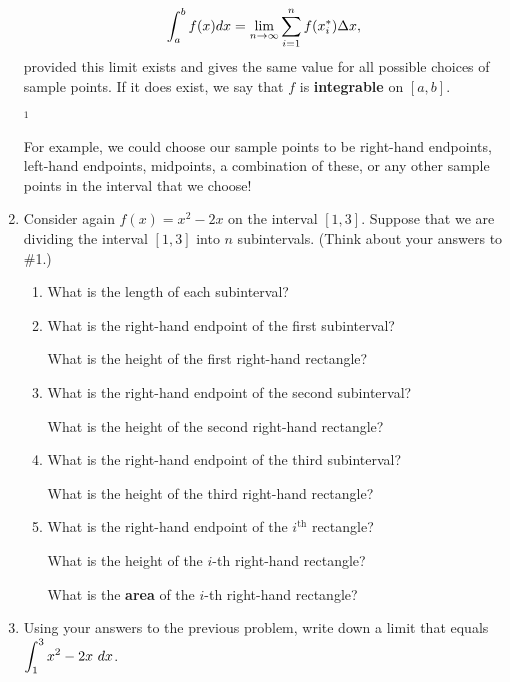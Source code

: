 \documentclass[11pt,fleqn]{article}
\newcommand{\be}{\begin{enumerate}}
\newcommand{\ee}{\end{enumerate}}
\begin{document}
\begin{enumerate}
\begin{framed}
$$\displaystyle \int_a^b f(x) dx = \lim_{n \to \infty} \sum_{i=1}^n f(x_i^*)
\Delta x,$$
provided this limit exists and gives the same value for all possible
choices of sample points. If it does exist, we say that $f$ is
\textbf{integrable} on $[a, b]$.

\smallskip
${}^{1}$ \begin{footnotesize}For example, we could choose our sample points to be right-hand endpoints, left-hand endpoints, midpoints,  a combination of these, or any other sample points in the interval that we choose!\end{footnotesize}

\end{framed}



\item Consider again $f(x) = x^2 - 2x$ on the interval $[1,
3]$. Suppose that we are dividing the interval $[1,3]$ into $n$ subintervals.  (Think about your answers to \#1.)

\be

\item What is the length of each subinterval? \hrulefill
\vfill
\item What is the right-hand endpoint of the first subinterval? \hrulefill 
\vfill

What is the height of the first right-hand rectangle? \hrulefill
\vfill

\item What is the right-hand endpoint of the second subinterval? \hrulefill
\vfill

What is the height of the second right-hand rectangle? \hrulefill
\vfill

\item What is the right-hand endpoint of the third subinterval?\hrulefill 
\vfill

What is the height of the third right-hand rectangle? \hrulefill
\vfill

\item What is the right-hand endpoint of the $i^{\text{th}}$ rectangle? \hrulefill
\vfill


What is the height of the $i$-th right-hand rectangle? \hrulefill
\vfill

What is the {\bf area} of the $i$-th right-hand rectangle? \hrulefill
\vfill

\ee

\item Using your answers to the previous problem, write down a limit that equals $\d \int_{1}^{3}  x^2 - 2x \ dx$.


\end{enumerate}
\end{document}
